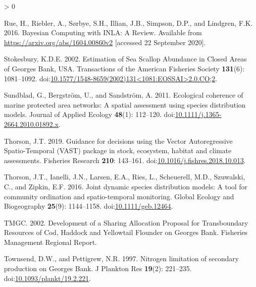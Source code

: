 \documentclass[
]{article}
\newlength{\cslhangindent}
\newenvironment{CSLReferences}[2] %
 {%
  \setlength{\parindent}{0pt}
  \ifodd #1 \everypar{\setlength{\hangindent}{\cslhangindent}}\ignorespaces\fi
  \ifnum #2 > 0
  \setlength{\parskip}{#2\baselineskip}
  \fi
 }%
 {}
\begin{document}
\begin{CSLReferences}{1}{0}
\leavevmode\hypertarget{ref-rueBayesianComputingINLA2016}{}%
Rue, H., Riebler, A., Sørbye, S.H., Illian, J.B., Simpson, D.P., and Lindgren, F.K. 2016. Bayesian {Computing} with {INLA}: {A Review}. Available from \url{https://arxiv.org/abs/1604.00860v2} {[}accessed 22 September 2020{]}.

\leavevmode\hypertarget{ref-stokesburyEstimationSeaScallop2002}{}%
Stokesbury, K.D.E. 2002. Estimation of {Sea Scallop Abundance} in {Closed Areas} of {Georges Bank}, {USA}. Transactions of the American Fisheries Society \textbf{131}(6): 1081--1092. doi:\href{https://doi.org/10.1577/1548-8659(2002)131\%3C1081:EOSSAI\%3E2.0.CO;2}{10.1577/1548-8659(2002)131\textless1081:EOSSAI\textgreater2.0.CO;2}.

\leavevmode\hypertarget{ref-sundbladEcologicalCoherenceMarine2011}{}%
Sundblad, G., Bergström, U., and Sandström, A. 2011. Ecological coherence of marine protected area networks: A spatial assessment using species distribution models. Journal of Applied Ecology \textbf{48}(1): 112--120. doi:\href{https://doi.org/10.1111/j.1365-2664.2010.01892.x}{10.1111/j.1365-2664.2010.01892.x}.

\leavevmode\hypertarget{ref-thorsonGuidanceDecisionsUsing2019}{}%
Thorson, J.T. 2019. Guidance for decisions using the {Vector Autoregressive Spatio}-{Temporal} ({VAST}) package in stock, ecosystem, habitat and climate assessments. Fisheries Research \textbf{210}: 143--161. doi:\href{https://doi.org/10.1016/j.fishres.2018.10.013}{10.1016/j.fishres.2018.10.013}.

\leavevmode\hypertarget{ref-thorsonJointDynamicSpecies2016}{}%
Thorson, J.T., Ianelli, J.N., Larsen, E.A., Ries, L., Scheuerell, M.D., Szuwalski, C., and Zipkin, E.F. 2016. Joint dynamic species distribution models: A tool for community ordination and spatio-temporal monitoring. Global Ecology and Biogeography \textbf{25}(9): 1144--1158. doi:\href{https://doi.org/10.1111/geb.12464}{10.1111/geb.12464}.

\leavevmode\hypertarget{ref-tmgcDevelopmentSharingAllocation2002}{}%
TMGC. 2002. Development of a {Sharing Allocation Proposal} for {Transboundary Resources} of {Cod}, {Haddock} and {Yellowtail Flounder} on {Georges Bank}. Fisheries Management Regional Report.

\leavevmode\hypertarget{ref-townsendNitrogenLimitationSecondary1997}{}%
Townsend, D.W., and Pettigrew, N.R. 1997. Nitrogen limitation of secondary production on {Georges Bank}. J Plankton Res \textbf{19}(2): 221--235. doi:\href{https://doi.org/10.1093/plankt/19.2.221}{10.1093/plankt/19.2.221}.


\end{CSLReferences}
\end{document}
